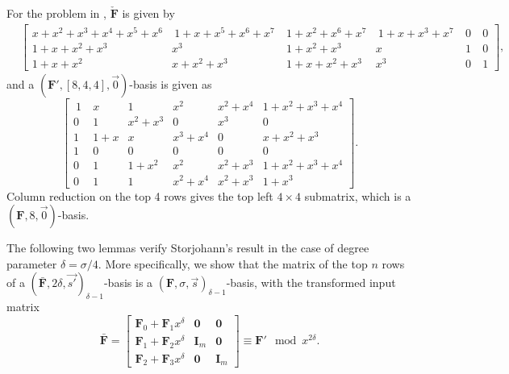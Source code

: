 \begin{exmp}
\label{exm:auxiliaryTransformation}For the problem in ,
$\check{\mathbf{F}}$ is given by \begin{align*}
 & \left[{\begin{array}{cccccr}
x+x^{2}+x^{3}+x^{4}+x^{5}+x^{6} & \ 1+x+x^{5}+x^{6}+x^{7}\  & 1+x^{2}+x^{6}+x^{7} & \ 1+x+x^{3}+x^{7}\  & 0\  & 0\\
1+x+x^{2}+x^{3} & x^{3} & 1+x^{2}+x^{3} & x & 1\  & 0\\
1+x+x^{2} & x+x^{2}+x^{3} & 1+x+x^{2}+x^{3} & x^{3} & 0\  & 1\end{array}}\right],\end{align*}
 and a $\left(\mathbf{F}',\left[8,4,4\right],\vec{0}\right)$-basis
is given as \[
\left[\begin{array}{cccc|cc}
~1~ & x & 1 & x^{2} & x^{2}+x^{4} & 1+x^{2}+x^{3}+x^{4}\\
0 & 1 & x^{2}+x^{3} & 0 & x^{3} & 0\\
1 & 1+x & x & x^{3}+x^{4} & 0 & x+x^{2}+x^{3}\\
1 & 0 & 0 & 0 & 0 & 0\\
\hline 0 & 1 & 1+x^{2} & x^{2} & x^{2}+x^{3} & 1+x^{2}+x^{3}+x^{4}\\
0 & 1 & 1 & x^{2}+x^{4} & x^{2}+x^{3} & 1+x^{3}\end{array}\right].\]
Column reduction on the top 4 rows gives the top left $4\times4$
submatrix, which is a \textbf{$(\mathbf{F},8,\vec{0})$}-basis. 
\end{exmp}
The following two lemmas verify Storjohann's result in the case of
degree parameter $\delta=\sigma/4$. More specifically, we show that
the matrix of the top $n$ rows of a $(\bar{\mathbf{F}},2\delta,\vec{s'})_{\delta-1}$-basis
is a $\left(\mathbf{F},\sigma,\vec{s}\right)_{\delta-1}$-basis, with
the transformed input matrix \begin{equation}
\bar{\mathbf{F}}=\left[\begin{array}{l|cr}
\mathbf{F}_{0}+\mathbf{F}_{1}x^{\delta} & \mathbf{0} & \mathbf{0}\\
\hline \mathbf{F}_{1}+\mathbf{F}_{2}x^{\delta} & \mathbf{I}_{m} & \mathbf{0}\\
\mathbf{F}_{2}+\mathbf{F}_{3}x^{\delta} & \mathbf{0} & \mathbf{I}_{m}\end{array}\right]\equiv\mathbf{F}'\mod x^{2\delta}.\label{eq:storjohannTransformation4parts}\end{equation}

